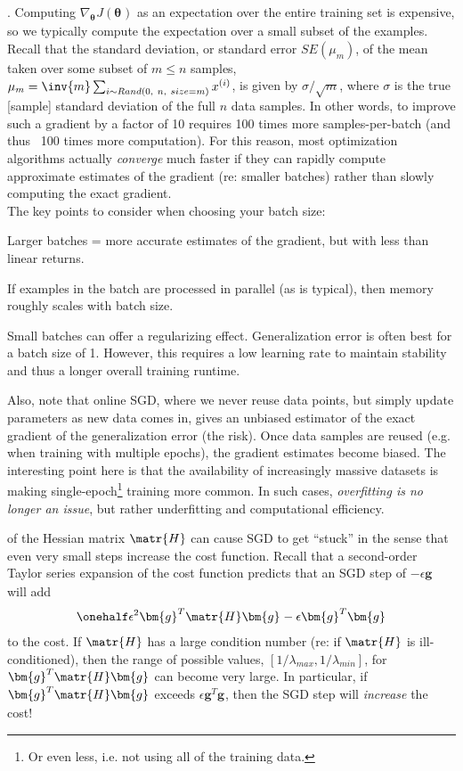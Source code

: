 \documentclass[11pt]{article}
\renewcommand\vec[2][]{\bm{#2}_{#1}}
\newcommand\myspace[1][]{\vspace{#1\bigskipamount}}
\newcommand\p{\Needspace{10\baselineskip} \noindent}
\begin{document}
\myspace
\p {}. Computing $\nabla_{\vec \theta} J(\vec \theta)$ as an expectation over the entire training set is expensive, so we typically compute the expectation over a small subset of the examples. Recall that the standard deviation, or standard error $SE(\mu_m)$, of the mean taken over some subset of $m \le n$ samples, $\mu_m = \inv{m} \sum_{i \sim Rand(0,~n,~ size=m)} x^{(i)}$, is given by $\sigma / \sqrt{m}$, where $\sigma$ is the true [sample] standard deviation of the full $n$ data samples. In other words, to improve such a gradient by a factor of 10 requires 100 times more samples-per-batch (and thus ~100 times more computation). For this reason, most optimization algorithms actually \textit{converge} much faster if they can rapidly compute approximate estimates of the gradient (re: smaller batches) rather than slowly computing the exact gradient. \\

\p The key points to consider when choosing your batch size:
\begin{compactenum}
	\item Larger batches = more accurate estimates of the gradient, but with less than linear returns.
	
	\item If examples in the batch are processed in parallel (as is typical), then memory roughly scales with batch size.
	
	\item Small batches can offer a regularizing effect. Generalization error is often best for a batch size of 1. However, this requires a low learning rate to maintain stability and thus a longer overall training runtime. 
\end{compactenum}
Also, note that online SGD, where we never reuse data points, but simply update parameters as new data comes in, gives an unbiased estimator of the exact gradient of the generalization error (the risk). Once data samples are reused (e.g. when training with multiple epochs), the gradient estimates become biased. The interesting point here is that the availability of increasingly massive datasets is making single-epoch\footnote{Or even less, i.e. not using all of the training data.} training more common. In such cases, \textit{overfitting is no longer an issue}, but rather underfitting and computational efficiency. 

\p {} of the Hessian matrix $\matr{H}$ can cause SGD to get ``stuck'' in the sense that even very small steps increase the cost function. Recall that a second-order Taylor series expansion of the cost function predicts that an SGD step of $-\epsilon \vec{g}$ will add 
\begin{align}
	 \onehalf \epsilon^2 \vec{g}^T \matr{H} \vec{g}  - \epsilon \vec{g}^T\vec{g} \label{delta-sgd}
\end{align}
to the cost. If $\matr{H}$ has a large condition number (re: if $\matr{H}$ is ill-conditioned), then the range of possible values, $[1/\lambda_{max}, 1/\lambda_{min}]$, for $ \vec{g}^T \matr{H} \vec{g} $ can become very large. In particular, if $ \vec{g}^T \matr{H} \vec{g} $ exceeds $\epsilon \vec{g}^T \vec{g}$, then the SGD step will \textit{increase} the cost!
\end{document}
